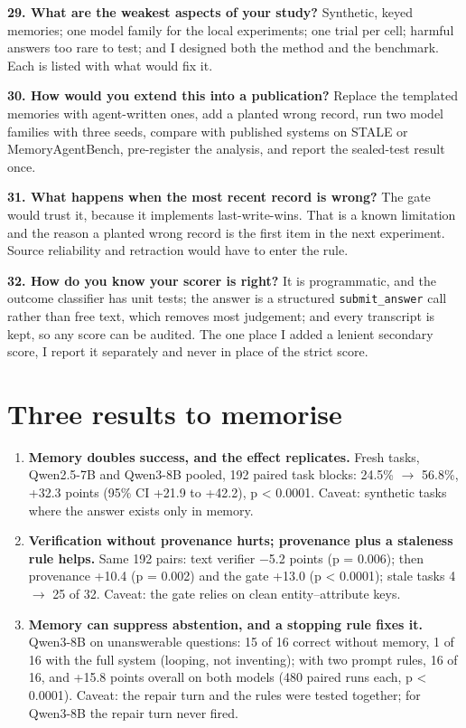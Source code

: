 \documentclass[10.5pt,a4paper,oneside]{report}
\begin{document}
\textbf{29. What are the weakest aspects of your study?} Synthetic, keyed memories; one model family for the local experiments; one trial per cell; harmful answers too rare to test; and I designed both the method and the benchmark. Each is listed with what would fix it.

\textbf{30. How would you extend this into a publication?} Replace the templated memories with agent-written ones, add a planted wrong record, run two model families with three seeds, compare with published systems on STALE or MemoryAgentBench, pre-register the analysis, and report the sealed-test result once.

\textbf{31. What happens when the most recent record is wrong?} The gate would trust it, because it implements last-write-wins. That is a known limitation and the reason a planted wrong record is the first item in the next experiment. Source reliability and retraction would have to enter the rule.

\textbf{32. How do you know your scorer is right?} It is programmatic, and the outcome classifier has unit tests; the answer is a structured \texttt{submit\_\allowbreak{}answer} call rather than free text, which removes most judgement; and every transcript is kept, so any score can be audited. The one place I added a lenient secondary score, I report it separately and never in place of the strict score.

\section{Three results to memorise}
\begin{enumerate}
\item \textbf{Memory doubles success, and the effect replicates.} Fresh tasks, Qwen2.5-7B and Qwen3-8B pooled, 192 paired task blocks: 24.5\% $\rightarrow$ 56.8\%, +32.3 points (95\% CI +21.9 to +42.2), p < 0.0001. Caveat: synthetic tasks where the answer exists only in memory.
\item \textbf{Verification without provenance hurts; provenance plus a staleness rule helps.} Same 192 pairs: text verifier −5.2 points (p = 0.006); then provenance +10.4 (p = 0.002) and the gate +13.0 (p < 0.0001); stale tasks 4 $\rightarrow$ 25 of 32. Caveat: the gate relies on clean entity–attribute keys.
\item \textbf{Memory can suppress abstention, and a stopping rule fixes it.} Qwen3-8B on unanswerable questions: 15 of 16 correct without memory, 1 of 16 with the full system (looping, not inventing); with two prompt rules, 16 of 16, and +15.8 points overall on both models (480 paired runs each, p < 0.0001). Caveat: the repair turn and the rules were tested together; for Qwen3-8B the repair turn never fired.
\end{enumerate}
\end{document}
